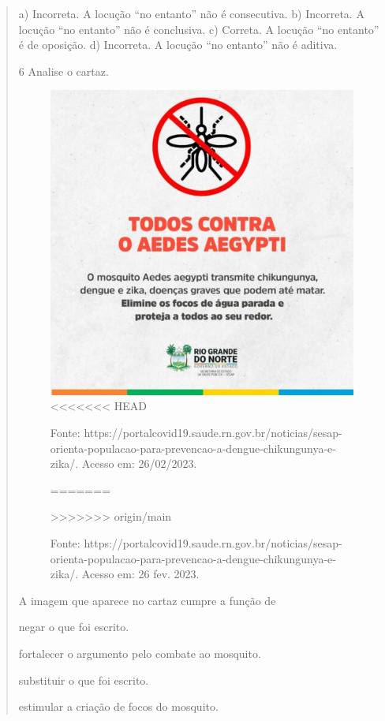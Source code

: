 \begin{quote}
{a) Incorreta. A locução “no entanto” não é consecutiva.
b) Incorreta. A locução “no entanto” não é conclusiva.
c) Correta. A locução “no entanto” é de oposição.
d) Incorreta. A locução “no entanto” não é aditiva.}

\num{6} Analise o cartaz.

\begin{figure}[htpb!]
\includegraphics[width=.5\textwidth]{./imgs/img25.jpg}
<<<<<<< HEAD
\caption{Fonte: https://portalcovid19.saude.rn.gov.br/noticias/sesap-orienta-populacao-para-prevencao-a-dengue-chikungunya-e-zika/. Acesso em: 26/02/2023.}
=======
\caption{Fonte: https://portalcovid19.saude.rn.gov.br/noticias/sesap-orienta-populacao-para-prevencao-a-dengue-chikungunya-e-zika/. Acesso em: 26 fev. 2023.}
>>>>>>> origin/main
\end{figure}

A imagem que aparece no cartaz cumpre a função de

\begin{escolha}
\item negar o que foi escrito.

\item fortalecer o argumento pelo combate ao mosquito.

\item substituir o que foi escrito.

\item estimular a criação de focos do mosquito.
\end{escolha}



\end{quote}
